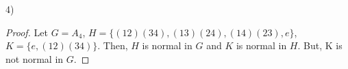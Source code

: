 \documentclass[executivepaper]{article}
\begin{document}
\begin{flushleft}

4)

\begin{proof}

Let $G=A_{4}$, $H=\{(12)(34), (13)(24), (14)(23), e\}$,  $K=\{e, (12)(34)\}$. Then, $H$ is normal in $G$ and $K$ is normal in $H$. But, K is not normal in $G$.

\end{proof} 

\end{flushleft}
\end{document}
